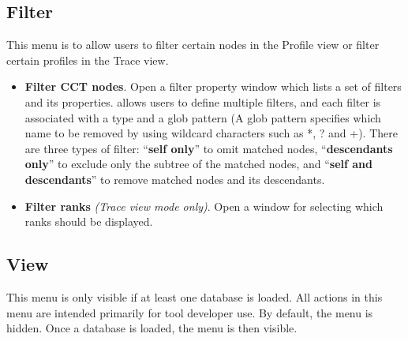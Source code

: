 \documentclass[english]{article}
\begin{document}

\subsection{Filter}
This menu is to allow users to filter certain nodes in the Profile view or filter certain profiles in the Trace view.
\begin{itemize}
 \item \textbf{Filter CCT nodes}.
  Open a filter property window which lists a set of filters and its properties.
 allows  users to define multiple filters, and each filter is associated with a type and a glob pattern (A glob pattern specifies which name to be removed by using wildcard characters such as *, ? and +).
There are three types of filter: ``\textbf{self only}'' to omit matched nodes, 
``\textbf{descendants only}'' to exclude only the subtree of the matched nodes, and ``\textbf{self and descendants}'' to
remove matched nodes and its descendants.

 \item \textbf{Filter ranks} \emph{(Trace view mode only)}.
  Open a window for selecting which ranks should be displayed.

\end{itemize}


\subsection{View}
This menu is only visible if at least one database is loaded.
All actions in this menu are intended primarily for tool developer use. 
By default, the menu is hidden. Once a database is loaded, the menu is then visible.
\end{document}
